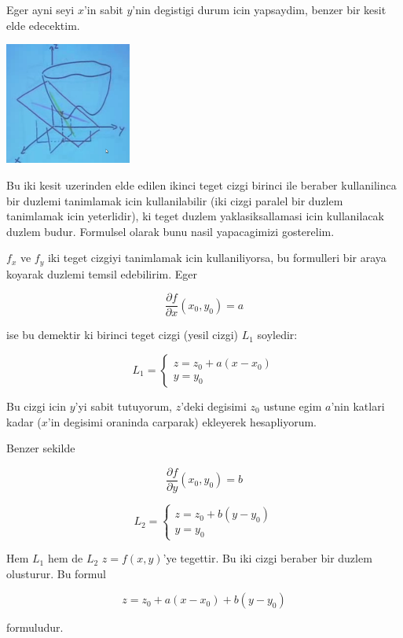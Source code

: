 \documentclass[12pt,fleqn]{article}
\begin{document}
Eger ayni seyi $x$'in sabit $y$'nin degistigi durum icin yapsaydim,
benzer bir kesit elde edecektim. 

\includegraphics[height=4cm]{9_2.png}

Bu iki kesit uzerinden elde edilen ikinci teget cizgi birinci ile beraber
kullanilinca bir duzlemi tanimlamak icin kullanilabilir (iki cizgi paralel
bir duzlem tanimlamak icin yeterlidir), ki teget duzlem yaklasiksallamasi
icin kullanilacak duzlem budur. Formulsel olarak bunu nasil yapacagimizi
gosterelim.

$f_x$ ve $f_y$ iki teget cizgiyi tanimlamak icin kullaniliyorsa, bu
formulleri bir araya koyarak duzlemi temsil edebilirim. Eger

\[ \frac{\partial f}{\partial x}(x_0,y_0) = a \]

ise bu demektir ki birinci teget cizgi (yesil cizgi) $L_1$ soyledir:

\[ 
L_1 = 
\left\{ \begin{array}{l}
z = z_0 + a(x - x_0) \\
y = y_0
\end{array} \right.
 \]

Bu cizgi icin $y$'yi sabit tutuyorum, $z$'deki degisimi $z_0$ ustune egim
$a$'nin katlari kadar ($x$'in degisimi oraninda carparak) ekleyerek
hesapliyorum. 

Benzer sekilde

\[ \frac{\partial f}{\partial y}(x_0,y_0) = b \]

\[ 
L_2 = 
\left\{ \begin{array}{l}
z = z_0 + b(y - y_0) \\
y = y_0
\end{array} \right.
 \]

Hem $L_1$ hem de $L_2$ $z = f(x,y)$'ye tegettir. Bu iki cizgi beraber bir
duzlem olusturur. Bu formul

\begin{equation}\label{eq2}
z = z_0 + a(x-x_0) + b(y-y_0) 
\end{equation}

formuludur. 
\end{document}
